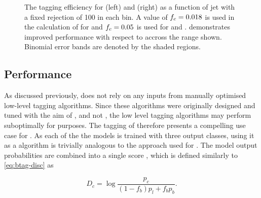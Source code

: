 \begin{figure}[!htbp]
\begin{subfigure}[b]{0.48\textwidth}
    \end{subfigure}
    \caption{The \bjet tagging efficiency for \ttbarjets (left) and \Zprimejets (right) as a function of jet \pt with a fixed \ljet rejection of 100 in each bin.
             A value of $f_c = 0.018$ is used in the calculation of \Db for \DLr and $f_c = 0.05$ is used for \GNN and \GNNLep.
             \GNN demonstrates improved performance with respect to \DLr accross the \pt range shown.
             Binomial error bands are denoted by the shaded regions.
             }
    \label{fig:vs_pt_flat_leff}
\end{figure}




\subsection{\texorpdfstring{\ctagging}{c-tagging} Performance}\label{sec:gnn_ctag_perf}

As discussed previously, \GNN does not rely on any inputs from manually optimised low-level tagging algorithms.
Since these algorithms were originally designed and tuned with the aim of \btag, and not \ctag, the low level tagging algorithms may perform suboptimally for \ctag purposes.
The tagging of \cjets therefore presents a compelling use case for \GNN.
As each of the the models is trained with three output classes, using it as a \ctagging algorithm is trivially analogous to the approach used for \btag.
The model output probabilities are combined into a single score \Dc, which is defined similarly to \cref{eq:btag-disc} as

\begin{equation}\label{eq:ctag-disc}
    D_c = \log{\frac{p_c}{(1-f_b)p_l + f_b p_b}} .
\end{equation}

